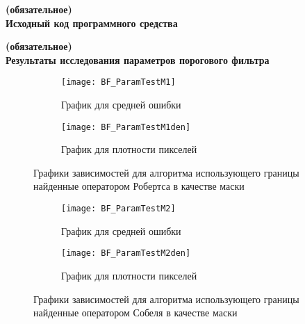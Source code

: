 
\setcounter{section}{1}
\renewcommand{\thesection}{\Asbuk{section}}
\begin{center}
	\vspace{-1em}
	\textbf{(обязательное)}\\	
	\textbf{Исходный код программного средства}
\end{center}
\lstset{
	basicstyle=\footnotesize\ttfamily,
	breaklines=true, 
	language=C++,
	numbers=left,                    
	numbersep=5pt,
	tabsize=2,			
}


%

\setcounter{section}{2}
\setcounter{figure}{0}
\begin{center}
	\vspace{-1em}
	\textbf{(обязательное)}\\	
	\textbf{Результаты исследования параметров порогового фильтра}
\end{center}
\begin{figure}[h]
	\centering
	\begin{subfigure}{0.45\textwidth}  
		\centering
		\texttt{[image: BF\_ParamTestM1]}
		\caption*{График для средней ошибки}
	\end{subfigure}    
	\begin{subfigure}{0.45\textwidth}  
		\centering
		\texttt{[image: BF\_ParamTestM1den]}        
		\caption*{График для плотности пикселей}
	\end{subfigure}
	\caption{Графики зависимостей для алгоритма использующего границы найденные оператором Робертса в качестве маски}
	\label{fig:PT_BF_M1}
\end{figure}

\begin{figure}[h]
	\centering
	\begin{subfigure}{0.45\textwidth}  
		\centering
		\texttt{[image: BF\_ParamTestM2]}
		\caption*{График для средней ошибки}
	\end{subfigure}    
	\begin{subfigure}{0.45\textwidth}  
		\centering
		\texttt{[image: BF\_ParamTestM2den]}        
		\caption*{График для плотности пикселей}
	\end{subfigure}
	\caption{Графики зависимостей для алгоритма использующего границы найденные оператором Собеля в качестве маски}
	\label{fig:PT_BF_M2}
\end{figure}

